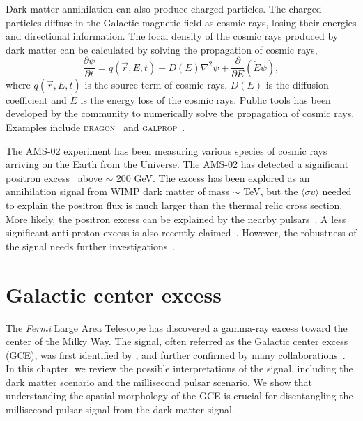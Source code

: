 \documentclass[doublespace,nopageskip]{VTthesis} %
\newcommand{\sigmav}{\langle\sigma v\rangle}
\begin{document}
Dark matter annihilation can also produce charged particles. The charged particles diffuse in the Galactic magnetic field as cosmic rays, losing their energies and directional information. The local density of the cosmic rays produced by dark matter can be calculated by solving the propagation of cosmic rays,
\begin{equation}
    \frac{\partial\psi}{\partial t} = q(\vec{r},E,t) + D(E)\nabla^2\psi + \frac{\partial}{\partial E}(\dot{E}\psi),
\end{equation}
where $q(\vec{r},E,t)$ is the source term of cosmic rays, $D(E)$ is the diffusion coefficient and $\dot{E}$ is the energy loss of the cosmic rays. Public tools has been developed by the community to numerically solve the propagation of cosmic rays. Examples include \textsc{dragon}~\cite{2010APh....34..274D} and \textsc{galprop}~\cite{1998ApJ...509..212S}.

The AMS-02 experiment has been measuring various species of cosmic rays arriving on the Earth from the Universe. The AMS-02 has detected a significant positron excess~\cite{2014PhRvL.113l1101A} above $\sim$ 200 GeV. The excess has been explored as an annihilation signal from WIMP dark matter of mass $\sim$ TeV, but the $\sigmav$ needed to explain the positron flux is much larger than the thermal relic cross section. More likely, the positron excess can be explained by the nearby pulsars~\cite{2009JCAP...01..025H}. A less significant anti-proton excess is also recently claimed~\cite{2017PhRvL.118s1101C}. However, the robustness of the signal needs further investigations~\cite{2019PhRvD..99j3026C, 2021arXiv210714606H}.


\chapter{Galactic center excess} \label{ch:GCE}

The \emph{Fermi} Large Area Telescope has discovered a gamma-ray excess toward the center of the Milky Way. The signal, often referred as the Galactic center excess (GCE), was first identified by \citet{2009arXiv0910.2998G}, and further confirmed by many collaborations~\cite{2009arXiv0912.3828V,2011PhLB..697..412H,2012PhRvD..86h3511A,2013PhRvD..88h3521G,2014PhRvD..89f3515M,2013PDU.....2..118H,2014PhRvD..90b3526A,2016PDU....12....1D,2015JCAP...03..038C,2015PhRvD..91l3010Z,2016ApJ...819...44A,2017ApJ...840...43A}. In this chapter, we review the possible interpretations of the signal, including the dark matter scenario and the millisecond pulsar scenario. We show that understanding the spatial morphology of the GCE is crucial for disentangling the millisecond pulsar signal from the dark matter signal.
\end{document}
